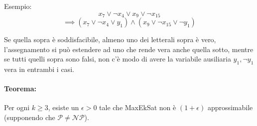 Esempio: 
$$ x_7 \vee \neg x_4 \vee x_9 \vee \neg x_{15} $$
$$ \implies (x_7 \vee \neg x_4 \vee y_1) \wedge (x_9 \vee \neg x_{15} \vee \neg y_1) $$

Se quella sopra è soddisfacibile, almeno uno dei letterali sopra è vero, l'assegnamento si può estendere ad uno che rende vera anche quella sotto, mentre se tutti quelli sopra sono falsi, non c'è modo di avere la variabile ausiliaria $y_1, \neg y_1$ vera in entrambi i casi.\\

\paragraph{Teorema:} Per ogni $k \geq 3$, esiste un $\epsilon > 0$ tale che MaxEkSat non è $(1+\epsilon)$ approssimabile (supponendo che $\mathcal{P} \neq \mathcal{NP}$).\\

